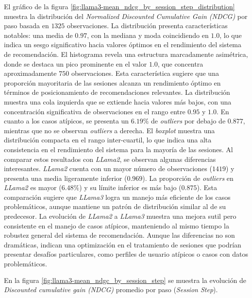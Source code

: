 \documentclass[11pt,a4paper,twoside]{thesis}
\begin{document}
El gráfico de la figura \ref{fig:llama3-mean_ndcg_by_session_step_distribution} muestra la distribución del \textit{Normalized Discounted Cumulative Gain (NDCG)} por paso basada en $1325$ observaciones. La distribución presenta características notables: una media de $0.97$, con la mediana y moda coincidiendo en $1.0$, lo que indica un sesgo significativo hacia valores óptimos en el rendimiento del sistema de recomendación.
El histograma revela una estructura marcadamente asimétrica, donde se destaca un pico prominente en el valor $1.0$, que concentra aproximadamente $750$ observaciones. Esta característica sugiere que una proporción mayoritaria de las sesiones alcanza un rendimiento óptimo en términos de posicionamiento de recomendaciones relevantes. La distribución muestra una cola izquierda que se extiende hacia valores más bajos, con una concentración significativa de observaciones en el rango entre $0.95$ y $1.0$.
En cuanto a los casos atípicos, se presenta un $6.19\%$ de \textit{outliers} por debajo de $0.877$, mientras que no se observan \textit{outliers} a derecha. El \textit{boxplot} muestra una distribución compacta en el rango inter-cuartil, lo que indica una alta consistencia en el rendimiento del sistema para la mayoría de las sesiones.
Al comparar estos resultados con \textit{LLama2}, se observan algunas diferencias interesantes. \textit{LLama2} cuenta con un mayor número de observaciones ($1419$) y presenta una media ligeramente inferior ($0.969$). La proporción de \textit{outliers} en \textit{LLama2} es mayor ($6.48\%$) y su límite inferior es más bajo ($0.875$). Esta comparación sugiere que \textit{LLama3} logra un manejo más eficiente de los casos problemáticos, aunque mantiene un patrón de distribución similar al de su predecesor.
La evolución de \textit{LLama2} a \textit{LLama3} muestra una mejora sutil pero consistente en el manejo de casos atípicos, manteniendo al mismo tiempo la robustez general del sistema de recomendación. Aunque las diferencias no son dramáticas, indican una optimización en el tratamiento de sesiones que podrían presentar desafíos particulares, como perfiles de usuario atípicos o casos con datos problemáticos.

\clearpage

En la figura \ref{fig:llama3-mean_ndgc_by_session_step} se muestra la evolución de \textit{Discounted cumulative gain (NDCG)} promedio por paso (\textit{Session Step}).
\end{document}
